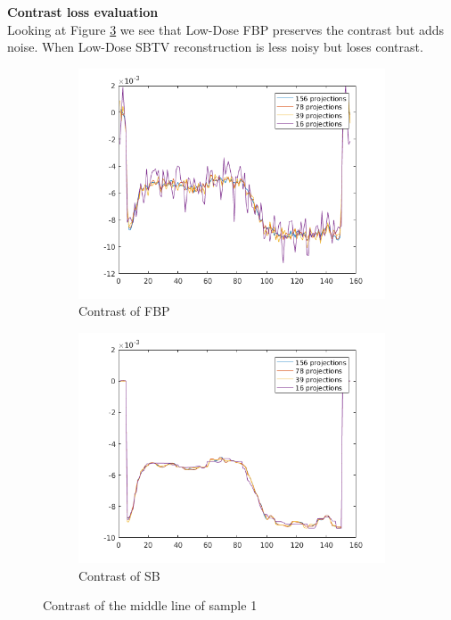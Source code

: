 \documentclass[10pt,a4paper,titlepage]{article}
\begin{document}
		\textbf{Contrast loss evaluation}\\
		
		Looking at Figure \ref{fig:contrastsF1} we see that Low-Dose FBP preserves the contrast but adds noise. When Low-Dose SBTV reconstruction is less noisy but loses contrast.
		
		\begin{figure}[H]
			\begin{subfigure}[b]{0.49\textwidth}
				\includegraphics[width=\textwidth]{Sample1/contrastFBP}
				\caption{Contrast of FBP}
				\label{subfig:ContrastFBP}
			\end{subfigure}
			\begin{subfigure}[b]{0.49\textwidth}
				\includegraphics[width=\textwidth]{Sample1/contrastSB}
				\caption{Contrast of SB}
				\label{subfig:ContrastSB}
			\end{subfigure}
			\caption{Contrast of the middle line of sample 1}
			\label{fig:contrastsF1}
		\end{figure}
\end{document}
